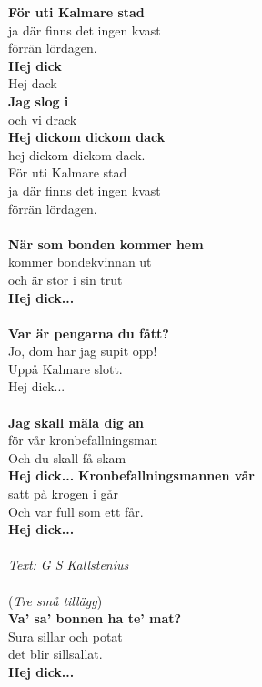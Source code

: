 \vspace{10pt}
\textbf{För uti Kalmare stad}\\
ja där finns det ingen kvast\\
förrän lördagen.\\
\textbf{Hej dick}\\
Hej dack\\
\textbf{Jag slog i}\\
och vi drack\\
\textbf{Hej dickom dickom dack}\\
hej dickom dickom dack.\\
För uti Kalmare stad\\
ja där finns det ingen kvast\\
förrän lördagen.\\
\\
\revrpt \textbf{När som bonden kommer hem}\\
kommer bondekvinnan ut\rpt\\
och är stor i sin trut\\
\textbf{Hej dick...}\\
\\
\revrpt \textbf{Var är pengarna du fått?}\\
Jo, dom har jag supit opp!\rpt\\
Uppå Kalmare slott.\\
Hej dick...\\
\\
\revrpt \textbf{Jag skall mäla dig an}\\
för vår kronbefallningsman\rpt\\
Och du skall få skam\\
\textbf{Hej dick...}
\newpage
\revrpt \textbf{Kronbefallningsmannen vår}\\
satt på krogen i går\rpt\\
Och var full som ett får.\\
\textbf{Hej dick...}\\
\\
{\footnotesize\textit{Text: G S Kallstenius}}\\
\\
(\textit{Tre små tillägg})\\
\revrpt \textbf{Va' sa' bonnen ha te' mat?}\\
Sura sillar och potat\rpt\\
det blir sillsallat.\\
\textbf{Hej dick...}\\
\\

